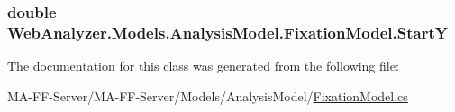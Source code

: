 \subsubsection[{Start\+Y}]{\setlength{\rightskip}{0pt plus 5cm}double Web\+Analyzer.\+Models.\+Analysis\+Model.\+Fixation\+Model.\+Start\+Y\hspace{0.3cm}{\ttfamily [get]}}\label{class_web_analyzer_1_1_models_1_1_analysis_model_1_1_fixation_model_a187714460ee0851def122bd776fbda91}


The documentation for this class was generated from the following file\+:\begin{DoxyCompactItemize}
\item 
M\+A-\/\+F\+F-\/\+Server/\+M\+A-\/\+F\+F-\/\+Server/\+Models/\+Analysis\+Model/\hyperlink{_fixation_model_8cs}{Fixation\+Model.\+cs}\end{DoxyCompactItemize}
